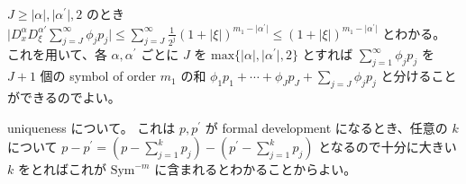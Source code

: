 \begin{Proof}
\itemprof
  \(J \geq \lvert \alpha \rvert , \lvert \alpha^\prime \rvert , 2\) のとき \(\lvert D^\alpha_x D^{\alpha\prime}_\xi \sum_{j = J}^\infty \phi_j p_j \rvert \leq \sum_{j = J}^\infty \frac{1}{2^j} (1 + \lvert \xi \rvert)^{m_1 - \lvert \alpha^\prime \rvert} \leq (1 + \lvert \xi \rvert)^{m_1 - \lvert \alpha^\prime \rvert}\) とわかる。
  これを用いて、各 \(\alpha , \alpha^\prime\) ごとに \(J\) を \(\text{max} \{\lvert \alpha \rvert , \lvert \alpha^\prime \rvert , 2\}\) とすれば \(\sum_{j = 1}^\infty \phi_j p_j\) を \(J + 1\) 個の symbol of order \(m_1\) の和 \(\phi_1 p_1 + \cdots + \phi_J p_J + \sum_{j = J} \phi_j p_j\) と分けることができるのでよい。
\end{Proof}

\begin{Proof}
\itemprof
  uniqueness について。
  これは \(p , p^{\prime}\) が formal development になるとき、任意の \(k\) について \(p - p^\prime = (p - \sum_{j=1}^k p_j) - (p^\prime - \sum_{j=1}^k p_j)\) となるので十分に大きい \(k\) をとればこれが \(\text{Sym}^{-m}\) に含まれるとわかることからよい。
\end{Proof}